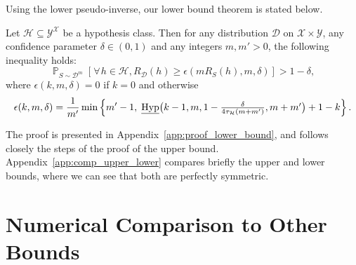\documentclass[twoside,11pt]{article}
\let\oldforall=\forall
\renewcommand{\forall}{\hspace{1pt}\oldforall\hspace{1pt}}
\newcommand{\cb}[1]{\left\{#1\right\}}
\newcommand{\D}{\mathcal{D}}
\renewcommand{\H}{{\mathcal{H}}}
\DeclareMathOperator*{\Prob}{\mathds{P}}
\newcommand{\prob}[2]{\Prob_{#1}\left[#2\right]}
\newcommand{\HypInvLower}{\underline{\textnormal{Hyp}}}
\begin{document}
Using the lower pseudo-inverse, our lower bound theorem is stated below.
\begin{theorem}
\label{thm:lower_bound}
Let $\H \subseteq \mathcal{Y}^\mathcal{X}$ be a hypothesis class.
Then for any distribution $\D$ on $\mathcal{X} \times \mathcal{Y}$, any confidence parameter $\delta \in (0, 1)$ and any integers $m, m'>0$, the following inequality holds:
\begin{equation*}
\prob{S\sim\D^m}{\forall h \in \H, R_\D(h) \geq \epsilon(m R_S(h), m, \delta)} > 1 - \delta,
\end{equation*}
where $\epsilon(k,m,\delta) = 0$ if $k=0$ and otherwise
\begin{equation*}
\epsilon(k, m, \delta) = \frac{1}{m'} \min\cb{ m'-1,\; \HypInvLower\big(k-1, m, 1- \textstyle\frac{\delta}{4 \tau_\H(m + m')}, m + m'\big) + 1 - k }.
\end{equation*}
\end{theorem}
The proof is presented in Appendix~\ref{app:proof_lower_bound}, and follows closely the steps of the proof of the upper bound.
Appendix~\ref{app:comp_upper_lower} compares briefly the upper and lower bounds, where we can see that both are perfectly symmetric.







\section{Numerical Comparison to Other Bounds}
\label{sec:numerical_comparison}
\end{document}

